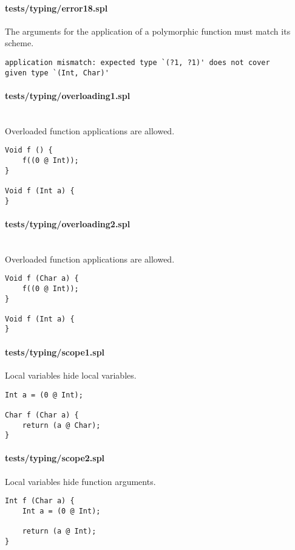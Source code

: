\documentclass[a4paper]{article}
\begin{document}
\paragraph{tests/typing/error18.spl}
The arguments for the application of a polymorphic function must match its scheme.
    \begin{verbatim}
application mismatch: expected type `(?1, ?1)' does not cover
given type `(Int, Char)'\end{verbatim}

\paragraph{tests/typing/overloading1.spl}\mbox{}\\ %
Overloaded function applications are allowed.
    \begin{verbatim}
Void f () {
    f((0 @ Int));
}

Void f (Int a) {
}\end{verbatim}

\paragraph{tests/typing/overloading2.spl}\mbox{}\\ %
Overloaded function applications are allowed.
    \begin{verbatim}
Void f (Char a) {
    f((0 @ Int));
}

Void f (Int a) {
}\end{verbatim}

\paragraph{tests/typing/scope1.spl}
Local variables hide local variables.
    \begin{verbatim}
Int a = (0 @ Int);

Char f (Char a) {
    return (a @ Char);
}\end{verbatim}

\paragraph{tests/typing/scope2.spl}
Local variables hide function arguments.
    \begin{verbatim}
Int f (Char a) {
    Int a = (0 @ Int);

    return (a @ Int);
}\end{verbatim}
\end{document}

